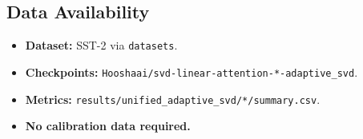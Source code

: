 \subsection{Data Availability}

\begin{itemize}
\item \textbf{Dataset:} SST-2 via \texttt{datasets}.
\item \textbf{Checkpoints:} \texttt{Hooshaai/svd-linear-attention-*-adaptive\_svd}.
\item \textbf{Metrics:} \texttt{results/unified\_adaptive\_svd/*/summary.csv}.
\item \textbf{No calibration data required.}

\end{itemize}
